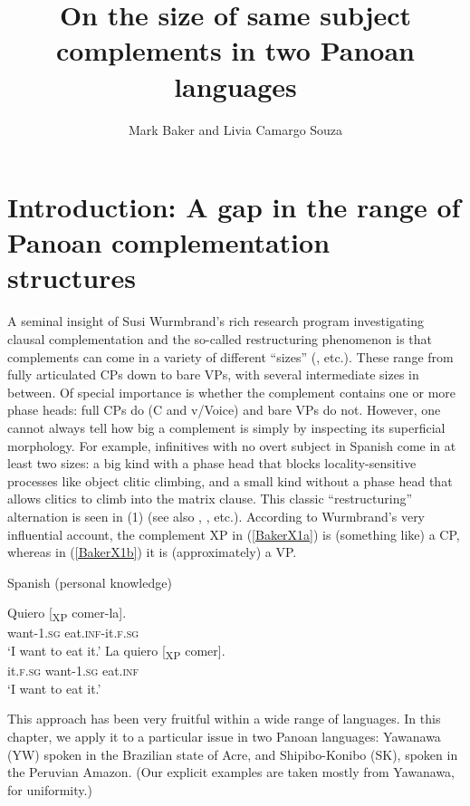 \documentclass[output=paper,colorlinks,citecolor=brown,
]{langscibook}
\author{Mark Baker\affiliation{Rutgers University} and Livia Camargo Souza\affiliation{Rutgers University}\orcid{}}
\title{On the size of same subject complements in two Panoan languages}
\renewcommand{\sc}[1]{\textsc{#1}}
\begin{document}
\maketitle

\section{Introduction: A gap in the range of Panoan complementation structures}
A seminal insight of Susi Wurmbrand’s rich research program investigating clausal complementation and the so-called restructuring phenomenon is that complements can come in a variety of different “sizes” (\citealt{wurmbrand2001infinitives}, etc.). These range from fully articulated CPs down to bare VPs, with several intermediate sizes in between. Of special importance is whether the complement contains one or more phase heads: full CPs do (C and v/Voice) and bare VPs do not. However, one cannot always tell how big a complement is simply by inspecting its superficial morphology. For example, infinitives with no overt subject in Spanish come in at least two sizes: a big kind with a phase head that blocks locality-sensitive processes like object clitic climbing, and a small kind without a phase head that allows clitics to climb into the matrix clause. This classic “restructuring” alternation is seen in (1) (see also \citealt{rizzi1982issues}, \citealt{burzio1986italian}, etc.). According to Wurmbrand’s very influential account, the complement XP in (\ref{BakerX1a}) is (something like) a CP, whereas in (\ref{BakerX1b}) it is (approximately) a VP.

\begin{exe}
    \ex Spanish (personal knowledge)
	    \begin{xlist}
			\ex \label{BakerX1a}
			\gll Quiero [\textsubscript{XP }comer-la].\\
			        want-1.\sc{sg} eat.\sc{inf}-it.\sc{f.sg}\\
			    \glt `I want to eat it.'
			\ex \label{BakerX1b}
			\gll La quiero [\textsubscript{XP }comer].\\
			        it.\sc{f.sg} want-1.\sc{sg} eat.\sc{inf}\\
			    \glt `I want to eat it.'
		\end{xlist}
\end{exe}

This approach has been very fruitful within a wide range of languages. In this chapter, we apply it to a particular issue in two Panoan languages: Yawanawa (YW) spoken in the Brazilian state of Acre, and Shipibo-Konibo (SK), spoken in the Peruvian Amazon. (Our explicit examples are taken mostly from Yawanawa, for uniformity.)\\
\end{document}
